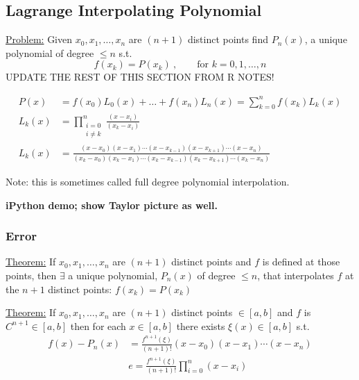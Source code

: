 \documentclass[12pt]{article}
\begin{document}
\subsection{Lagrange Interpolating Polynomial}
%
\underline{Problem:} Given $x_0, x_1,\dots, x_n$ are $(n+1)$ distinct points find $P_n(x)$, a unique polynomial of degree $\leq n$ s.t.\
\[f(x_k) = P(x_k)\:, \qquad \text{for }k= 0, 1, \dots, n\]
%
UPDATE THE REST OF THIS SECTION FROM R NOTES!

\begin{align}
P(x) &= f(x_0)L_0(x) + \dots + f(x_n)L_n(x) = \sum_{k=0}^{n}f(x_k)L_k(x) \\
%
L_k(x) &= \prod_{\substack{i=0\\ i \neq k}}^n \frac{(x-x_i)}{(x_k-x_i)}\\
%
L_k(x) &= \frac{(x-x_0)(x-x_1)\cdots(x-x_{k-1})(x-x_{k+1})\cdots(x-x_n)}{(x_k-x_0)(x_k-x_1)\cdots(x_k-x_{k-1})(x_k-x_{k+1})\cdots(x_k-x_n)}
\end{align}

Note: this is sometimes called full degree polynomial interpolation.

\textbf{iPython demo; show Taylor picture as well.}

\subsubsection{Error}
\underline{Theorem:} If $x_0, x_1,\dots, x_n$ are $(n+1)$ distinct points and $f$ is defined at those points, then $\exists$ a unique polynomial, $P_{n}(x)$ of degree $ \leq n$, that interpolates $f$ at the $n + 1$ distinct points: $f(x_k) = P(x_k)$

\underline{Theorem:} If $x_0, x_1,\dots, x_n$ are $(n+1)$ distinct points $\in [a,b]$ and $f$ is $C^{n+1} \in [a,b]$ then for each $x\in [a,b]$ there exists $\xi(x) \in [a,b]$ s.t.
\begin{align}
f(x) - P_n(x)& = \frac{f^{n+1}(\xi)}{(n+1)!}(x-x_0)(x-x_1)\cdots(x-x_n) \\
&\boxed{e = \frac{f^{n+1}(\xi)}{(n+1)!}\prod_{i=0}^n (x-x_i)}
\end{align}
%
%
\end{document}
